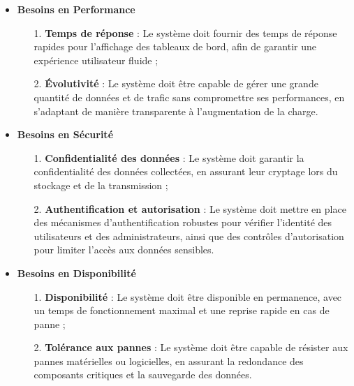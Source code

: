   \begin{itemize}
        \item\textbf{Besoins en Performance}

                \begin{enumerate}
                    \item[1.] \textbf{Temps de réponse} : Le système doit fournir des temps de réponse rapides pour l'affichage des tableaux de bord, afin de garantir une expérience utilisateur fluide ;
                    
                    \item[2.] \textbf{Évolutivité} : Le système doit être capable de gérer une grande quantité de données et de trafic sans compromettre ses performances, en s'adaptant de manière transparente à l'augmentation de la charge.
                \end{enumerate}
    
        \item\textbf{Besoins en Sécurité}
    
                \begin{enumerate}
                    \item[1.] \textbf{Confidentialité des données} : Le système doit garantir la confidentialité des données collectées, en assurant leur cryptage lors du stockage et de la transmission ;
                    
                    \item[2.] \textbf{Authentification et autorisation} : Le système doit mettre en place des mécanismes d'authentification robustes pour vérifier l'identité des utilisateurs 
                    et des administrateurs, ainsi que des contrôles d'autorisation pour limiter l'accès aux données sensibles.
                \end{enumerate}
    
        \item\textbf{Besoins en Disponibilité}
    
                \begin{enumerate}
                    \item[1.] \textbf{Disponibilité} : Le système doit être disponible en permanence, avec un temps de fonctionnement maximal et une reprise rapide en cas de panne ;
                    
                    \item[2.] \textbf{Tolérance aux pannes} : Le système doit être capable de résister aux pannes matérielles ou logicielles, en assurant la redondance des composants critiques et la sauvegarde des données.
                \end{enumerate}
    

\end{itemize}
